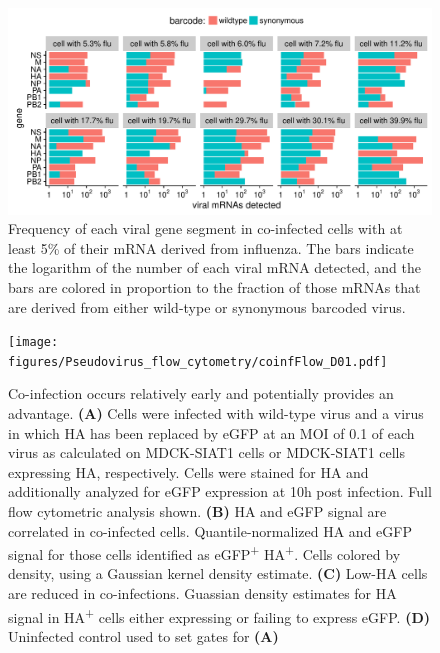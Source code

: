 \documentclass[9pt,lineno]{elife}
\begin{document}
\begin{figure}
\centerline{\includegraphics[width=0.9\linewidth]{figures/p_coinfection.pdf}}
\caption{\label{fig:coexpression}
Frequency of each viral gene segment in co-infected cells with at least 5\% of their mRNA derived from influenza.
The bars indicate the logarithm of the number of each viral mRNA detected, and the bars are colored in proportion to the fraction of those mRNAs that are derived from either wild-type or synonymous barcoded virus.
}
\end{figure}

\begin{figure}
\centerline{\texttt{[image: figures/Pseudovirus\_flow\_cytometry/coinfFlow\_D01.pdf]}}
\caption{\label{fig:flowcyto} Co-infection occurs relatively early and potentially provides an advantage. 
{\bf(A)} Cells were infected with wild-type virus and a virus in which HA has been replaced by eGFP at an MOI of 0.1 of each virus as calculated on MDCK-SIAT1 cells or MDCK-SIAT1 cells expressing HA, respectively.
Cells were stained for HA and additionally analyzed for eGFP expression at 10h post infection. Full flow cytometric analysis shown.
{\bf(B)} HA and eGFP signal are correlated in co-infected cells. Quantile-normalized HA and eGFP signal for those cells identified as eGFP\textsuperscript{+} HA\textsuperscript{+}. Cells colored by density, using a Gaussian kernel density estimate. 
{\bf(C)} Low-HA cells are reduced in co-infections. Guassian density estimates for HA signal in HA\textsuperscript{+} cells either expressing or failing to express eGFP. 
{\bf(D)} Uninfected control used to set gates for {\bf(A)}
}
\end{figure}
\end{document}
